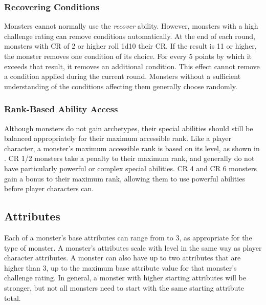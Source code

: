         \subsubsection{Recovering Conditions}
            Monsters cannot normally use the \textit{recover} ability.
            However, monsters with a high challenge rating can remove conditions automatically.
            At the end of each round, monsters with CR of 2 or higher roll 1d10 \add their CR.
            If the result is 11 or higher, the monster removes one condition of its choice.
            For every 5 points by which it exceeds that result, it removes an additional condition.
            This effect cannot remove a condition applied during the current round.
            Monsters without a sufficient understanding of the conditions affecting them generally choose randomly.

        \subsubsection{Rank-Based Ability Access}
            Although monsters do not gain archetypes, their special abilities should still be balanced appropriately for their maximum accessible rank.
            Like a player character, a monster's maximum accessible rank is based on its level, as shown in .
            CR 1/2 monsters take a  penalty to their maximum rank, and generally do not have particularly powerful or complex special abilities.
            CR 4 and CR 6 monsters gain a  bonus to their maximum rank, allowing them to use powerful abilities before player characters can.

    \subsection{Attributes}
        Each of a monster's base attributes can range from  to 3, as appropriate for the type of monster.
        A monster's attributes scale with level in the same way as player character attributes.
        A monster can also have up to two attributes that are higher than 3, up to the maximum base attribute value for that monster's challenge rating.
        In general, a monster with higher starting attributes will be stronger, but not all monsters need to start with the same starting attribute total.

